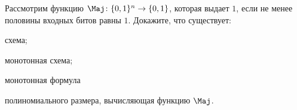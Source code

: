 Рассмотрим функцию $\Maj\colon \{0, 1\}^n \rightarrow \{0, 1\}$, которая выдает $1$, если не менее половины
входных битов равны $1$. Докажите, что существует:
\begin{enumcyr}
    \item схема;
    \item монотонная схема;
    \item монотонная формула
\end{enumcyr}
полиномиального размера, вычисляющая функцию $\Maj$.